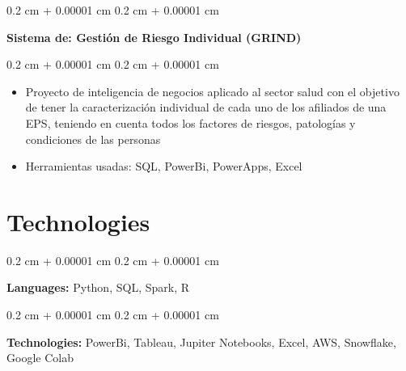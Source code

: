 \documentclass[10pt, letterpaper]{article}
\newenvironment{highlights}{
    \begin{itemize}[
        topsep=0.10 cm,
        parsep=0.10 cm,
        partopsep=0pt,
        itemsep=0pt,
        leftmargin=0.4 cm + 10pt
    ]
}{
    \end{itemize}
} %
\newenvironment{onecolentry}{
    \begin{adjustwidth}{
        0.2 cm + 0.00001 cm
    }{
        0.2 cm + 0.00001 cm
    }
}{
    \end{adjustwidth}
} %
\newenvironment{twocolentry}[2][]{
    \onecolentry
    \def\secondColumn{#2}
    \setcolumnwidth{\fill, 4.5 cm}
    \begin{paracol}{2}
}{
    \switchcolumn \raggedleft \secondColumn
    \end{paracol}
    \endonecolentry
} %
\begin{document}
        \begin{twocolentry}{
        \textit{ }}
            \textbf{Sistema de: Gestión de Riesgo Individual (GRIND)}
        \end{twocolentry}
        \vspace{0.10 cm}
        \begin{onecolentry}
            \begin{highlights}
                \item Proyecto de inteligencia de negocios aplicado al sector salud con el objetivo de tener la caracterización individual de cada uno de los afiliados de una EPS, teniendo en cuenta todos los factores de riesgos, patologías y condiciones de las personas
                \item Herramientas usadas: SQL, PowerBi, PowerApps, Excel
            \end{highlights}
        \end{onecolentry}




    \section{Technologies}
        
        \begin{onecolentry}
            \textbf{Languages:} Python, SQL, Spark, R
        \end{onecolentry}

        \vspace{0.2 cm}

        \begin{onecolentry}
            \textbf{Technologies:} PowerBi, Tableau, Jupiter Notebooks, Excel, AWS, Snowflake, Google Colab
        \end{onecolentry}


    
\end{document}
